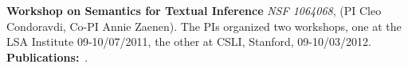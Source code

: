 \documentclass[10pt]{article}
\newcommand{\miniskip}{\vspace*{1mm}}
\begin{document}
\noindent
{\bf Workshop on Semantics for Textual Inference}
{\it  NSF  1064068}, (PI Cleo Condoravdi, Co-PI Annie Zaenen). The PIs organized two workshops, one at the LSA Institute 09-10/07/2011, the other at CSLI, Stanford, 09-10/03/2012.
{\bf Publications:}~\cite{Lilt-special-issue}.

 \nocite{zaenen+karttunen:2013}
\nocite{csli-gang-cssp13}
\nocite{csli-gang-cil13}
\nocite{faust-adj-pol-lex}

%
%
%
%
%
\end{document}
